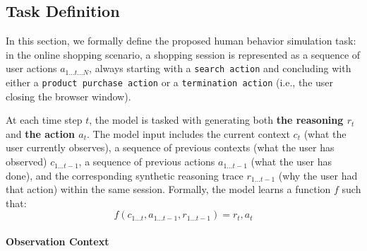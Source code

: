 \documentclass[11pt]{article}
\begin{document}
\subsection{Task Definition}  

In this section, we formally define the proposed human behavior simulation task: in the online shopping scenario,  a shopping session is represented as a sequence of user actions $a_{1 \dots t \dots N}$, always starting with a \texttt{search action} and concluding with either a \texttt{product purchase action} or a \texttt{termination action} (i.e., the user closing the browser window).  

At each time step \( t \), the model is tasked with generating both \textbf{the reasoning \( r_t \)} and \textbf{the  action \( a_t \)}. The model input includes the current context \( c_t \) (what the user currently observes), a sequence of previous contexts (what the user has observed) \( c_{1 \dots t-1} \), a sequence of previous actions \( a_{1 \dots t-1} \) (what the user has done), and the corresponding synthetic reasoning trace \( r_{1 \dots t-1} \) (why the user had that action) within the same session. Formally, the model learns a function \( f \) such that:  
\[
    f(c_{1 \dots t}, a_{1 \dots t-1}, r_{1 \dots t-1}) = r_t, a_t
\]


\paragraph{Observation Context}


\end{document}
